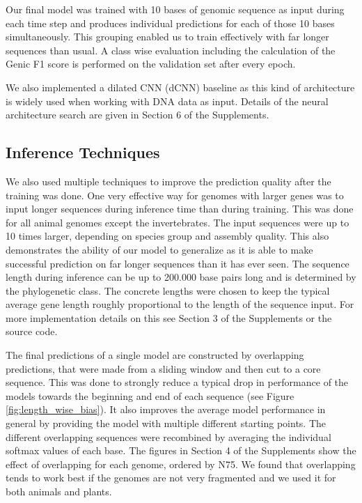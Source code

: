 \documentclass{bioinfo}
\begin{document}
\begin{methods}
Our final model was trained with 10 bases of genomic sequence as input during each time step and produces individual predictions for each of those 10 bases simultaneously. This grouping enabled us to train effectively with far longer sequences than usual. A class wise evaluation including the calculation of the Genic F1 score is performed on the validation set after every epoch.

We also implemented a dilated CNN (dCNN) baseline as this kind of architecture is widely used when working with DNA data as input. Details of the neural architecture search are given in Section 6 of the Supplements.

\subsection{Inference Techniques}
We also used multiple techniques to improve the prediction quality after the training was done. One very effective way for genomes with larger genes was to input longer sequences during inference time than during training. This was done for all animal genomes except the invertebrates. The input sequences were up to 10 times larger, depending on species group and assembly quality. This also demonstrates the ability of our model to generalize as it is able to make successful prediction on far longer sequences than it has ever seen. The sequence length during inference can be up to 200.000 base pairs long and is determined by the phylogenetic class. The concrete lengths were chosen to keep the typical average gene length roughly proportional to the length of the sequence input. For more implementation details on this see Section 3 of the Supplements or the source code.
	
The final predictions of a single model are constructed by overlapping predictions, that were made from a sliding window and then cut to a core sequence. This was done to strongly reduce a typical drop in performance of the models towards the beginning and end of each sequence (see Figure \ref{fig:length_wise_bias}). It also improves the average model performance in general by providing the model with multiple different starting points. The different overlapping sequences were recombined by averaging the individual softmax values of each base. The figures in Section 4 of the Supplements show the effect of overlapping for each genome, ordered by N75. We found that overlapping tends to work best if the genomes are not very fragmented and we used it for both animals and plants.


\end{methods}
\end{document}
